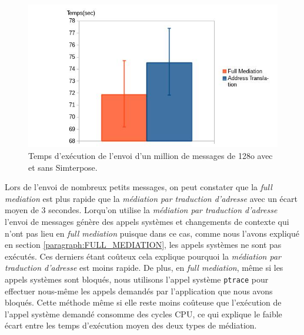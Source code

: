\begin{figure}[H]
  \centering
    \includegraphics[scale=0.5]{mesures/graph/Littlemsg.jpg}
    \caption{Temps d'exécution de l'envoi d'un million de messages de 128o avec et sans Simterpose.}
    \label{Network_Little_Mediation}
\end{figure}

Lors de l'envoi de nombreux petits messages, on peut constater que la \textit{full mediation} est plus rapide que la \textit{médiation par traduction d'adresse} avec un écart moyen de 3 secondes. Lorqu'on utilise la \textit{médiation par traduction d'adresse} l'envoi de messages génère des appels systèmes et changements de contexte qui n'ont pas lieu en \textit{full mediation} puisque dans ce cas, comme nous l'avons expliqué en section \ref{paragraph:FULL_MEDIATION}, les appels systèmes ne sont pas exécutés. Ces derniers étant coûteux cela explique pourquoi la  \textit{médiation par traduction d'adresse} est moins rapide. De plus, en \textit{full mediation}, même si les appels systèmes sont bloqués, nous utilisons l'appel système \texttt{ptrace} pour effectuer nous-même les appels demandés par l'application que nous avons bloqués. Cette méthode même si elle reste moins coûteuse que l'exécution de l'appel système demandé consomme des cycles CPU, ce qui explique le faible écart entre les temps d'exécution moyen des deux types de médiation.

